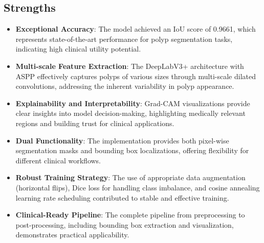 \documentclass[a4paper,12pt]{report}
\begin{document}
\subsection{Strengths}
\begin{itemize}
    \item \textbf{Exceptional Accuracy}: The model achieved an IoU score of 0.9661, which represents state-of-the-art performance for polyp segmentation tasks, indicating high clinical utility potential.
    \item \textbf{Multi-scale Feature Extraction}: The DeepLabV3+ architecture with ASPP effectively captures polyps of various sizes through multi-scale dilated convolutions, addressing the inherent variability in polyp appearance.
    \item \textbf{Explainability and Interpretability}: Grad-CAM visualizations provide clear insights into model decision-making, highlighting medically relevant regions and building trust for clinical applications.
    \item \textbf{Dual Functionality}: The implementation provides both pixel-wise segmentation masks and bounding box localizations, offering flexibility for different clinical workflows.
    \item \textbf{Robust Training Strategy}: The use of appropriate data augmentation (horizontal flips), Dice loss for handling class imbalance, and cosine annealing learning rate scheduling contributed to stable and effective training.
    \item \textbf{Clinical-Ready Pipeline}: The complete pipeline from preprocessing to post-processing, including bounding box extraction and visualization, demonstrates practical applicability.
\end{itemize}
\end{document}

